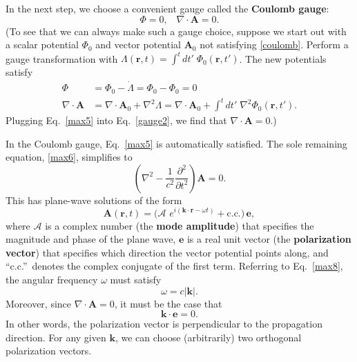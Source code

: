 \documentclass[prx,12pt]{revtex4-2}
\begin{document}
In the next step, we choose a convenient gauge called the
\textbf{Coulomb gauge}:
\begin{equation}
  \Phi = 0, \;\;\; \nabla \cdot \mathbf{A} = 0.
  \label{coulomb}
\end{equation}
(To see that we can always make such a gauge choice, suppose we start
out with a scalar potential $\Phi_0$ and vector potential
$\mathbf{A}_0$ not satisfying \eqref{coulomb}.  Perform a gauge
transformation with $\Lambda(\mathbf{r}, t) = \int^t dt'\;
\Phi_0(\mathbf{r}, t')$.  The new potentials satisfy
\begin{align}
  \Phi &= \Phi_0 - \dot{\Lambda} = \Phi_0 - \Phi_0 = 0 \\
  \nabla\cdot\mathbf{A} &= \nabla\cdot \mathbf{A}_0 + \nabla^2 \Lambda
  = \nabla\cdot \mathbf{A}_0 + \int^t dt'\; \nabla^2\Phi_0(\mathbf{r}, t').
  \label{gauge2}
\end{align}
Plugging Eq.~\eqref{max5} into Eq.~\eqref{gauge2}, we find that
$\nabla\cdot\mathbf{A} = 0$.)

In the Coulomb gauge, Eq.~\eqref{max5} is automatically satisfied.
The sole remaining equation, \eqref{max6}, simplifies to
\begin{equation}
  \left(\nabla^2 - \frac{1}{c^2}\frac{\partial^2}{\partial t^2}\right)
  \mathbf{A} = 0. \label{max8}
\end{equation}
This has plane-wave solutions of the form
\begin{equation}
  \mathbf{A}(\mathbf{r},t) = \Big(\mathcal{A}\, \,
  e^{i(\mathbf{k}\cdot\mathbf{r} - \omega t)} + \mathrm{c.c.}\Big)\,
  \mathbf{e},
  \label{lightplanewave}
\end{equation}
where $\mathcal{A}$ is a complex number (the \textbf{mode amplitude})
that specifies the magnitude and phase of the plane wave, $\mathbf{e}$
is a real unit vector (the \textbf{polarization vector}) that
specifies which direction the vector potential points along, and
``c.c.''~denotes the complex conjugate of the first term.  Referring
to Eq.~\eqref{max8}, the angular frequency $\omega$ must satisfy
\begin{equation}
  \omega = c|\mathbf{k}|.
\end{equation}
Moreover, since $\nabla \cdot \mathbf{A} = 0$, it must be the case
that
\begin{equation}
  \mathbf{k} \cdot \mathbf{e} = 0.
\end{equation}
In other words, the polarization vector is perpendicular to the
propagation direction.  For any given $\mathbf{k}$, we can choose
(arbitrarily) two orthogonal polarization vectors.
\end{document}
